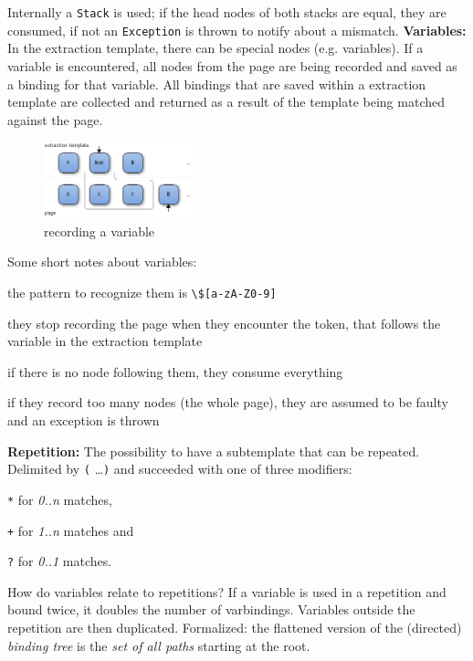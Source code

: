 Internally a \texttt{Stack} is used; if the head nodes of both stacks are equal, they are consumed, if not an \texttt{Exception} is thrown to notify about a mismatch.\newline
\textbf{Variables:}
In the extraction template, there can be special nodes (e.g. variables). 
If a variable is encountered, all nodes from the page are being recorded and saved as a binding for that variable. 
All bindings that are saved within a extraction template are collected and returned as a result of the template being matched against the page.
\begin{figure}[h]
\centering
\includegraphics[width=0.4\textwidth]{../images/varbinding}
\caption{recording a variable}
\label{fig:varbinding}
\end{figure}
Some short notes about variables:
\begin{compactitem}
\item the pattern to recognize them is \texttt{\textbackslash\$[a-zA-Z0-9]}
\item they stop recording the page when they encounter the token, that follows the variable in the extraction template
\item if there is no node following them, they consume everything
\item if they record too many nodes (the whole page), they are assumed to be faulty and an exception is thrown
\end{compactitem}
\textbf{Repetition:}
The possibility to have a subtemplate that can be repeated. 
Delimited by \texttt{(} \ldots \texttt{)} and succeeded with one of three modifiers:
\begin{compactitem}
\item \texttt{*} for \textit{0..n} matches,
\item \texttt{+} for \textit{1..n} matches and 
\item \texttt{?} for \textit{0..1} matches.
\end{compactitem}
How do variables relate to repetitions? If a variable is used in a repetition and bound twice, it doubles the number of varbindings. 
Variables outside the repetition are then duplicated. Formalized: the flattened version of the (directed) \textit{binding tree} is the \textit{set of all paths} starting at the root.
